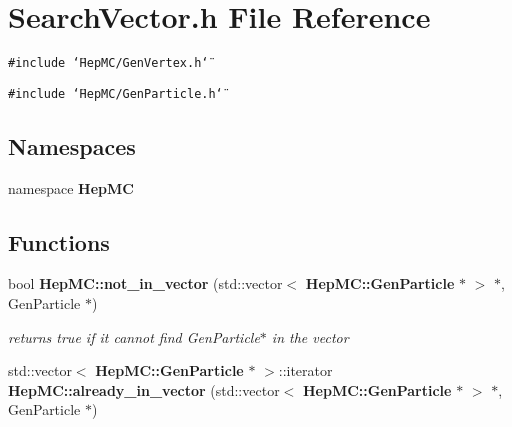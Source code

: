 \section{Search\-Vector.h File Reference}
\label{SearchVector_8h}
{\tt \#include \char`\"{}Hep\-MC/Gen\-Vertex.h\char`\"{}}\par
{\tt \#include \char`\"{}Hep\-MC/Gen\-Particle.h\char`\"{}}\par
\subsection*{Namespaces}
\begin{CompactItemize}
\item 
namespace {\bf Hep\-MC}
\end{CompactItemize}
\subsection*{Functions}
\begin{CompactItemize}
\item 
bool {\bf Hep\-MC::not\_\-in\_\-vector} (std::vector$<$ {\bf Hep\-MC::Gen\-Particle} $\ast$ $>$ $\ast$, Gen\-Particle $\ast$)
\begin{CompactList}\small\item\em returns true if it cannot find Gen\-Particle$\ast$ in the vector \item\end{CompactList}\item 
std::vector$<$ {\bf Hep\-MC::Gen\-Particle} $\ast$ $>$::iterator {\bf Hep\-MC::already\_\-in\_\-vector} (std::vector$<$ {\bf Hep\-MC::Gen\-Particle} $\ast$ $>$ $\ast$, Gen\-Particle $\ast$)
\end{CompactItemize}
